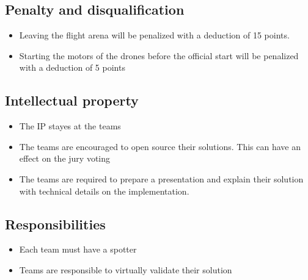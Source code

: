 \subsection{Penalty and disqualification}
\begin{itemize}
	\item Leaving the flight arena will be penalized with a deduction of 15 points.
	\item Starting the motors of the drones before the official start will be penalized with a deduction of 5 points 
\end{itemize}

\subsection{Intellectual property}
\begin{itemize}
	\item{The IP stayes at the teams}
	\item{The teams are encouraged to open source their solutions. This can have an effect on the jury voting}
	\item{The teams are required to prepare a presentation and explain their solution with technical details on the implementation.}
\end{itemize}

\subsection{Responsibilities}
\begin{itemize}
	\item Each team must have a spotter
	\item Teams are responsible to virtually validate their solution
\end{itemize}
